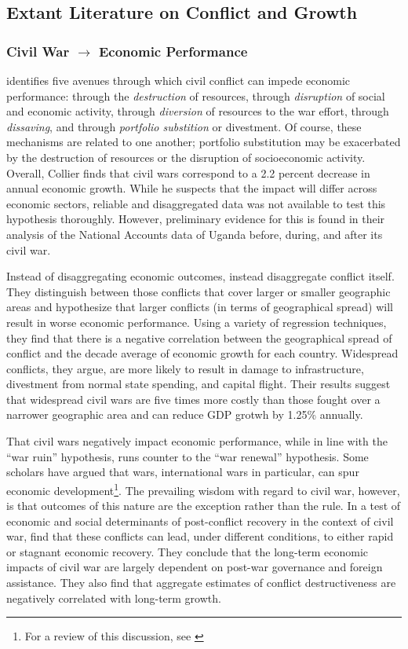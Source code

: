 \subsection{Extant Literature on Conflict and Growth}
\label{lit}

\subsubsection{Civil War $\rightarrow$ Economic Performance}

\cite{collier:1999} identifies five avenues through which civil conflict can impede economic performance: through the \textit{destruction} of resources, through \textit{disruption} of social and economic activity, through \textit{diversion} of resources to the war effort, through \textit{dissaving}, and through \textit{portfolio substition} or divestment. Of course, these mechanisms are related to one another; portfolio substitution may be exacerbated by the destruction of resources or the disruption of socioeconomic activity. Overall, Collier finds that civil wars correspond to a 2.2 percent decrease in annual economic growth. While he suspects that the impact will differ across economic sectors, reliable and disaggregated data was not available to test this hypothesis thoroughly. However, preliminary evidence for this is found in their analysis of the National Accounts data of Uganda before, during, and after its civil war.

Instead of disaggregating economic outcomes, \cite{imai:weinstein:2000} instead disaggregate conflict itself. They distinguish between those conflicts that cover larger or smaller geographic areas and hypothesize that larger conflicts (in terms of geographical spread) will result in worse economic performance. Using a variety of regression techniques, they find that there is a negative correlation between the geographical spread of conflict and the decade average of economic growth for each country. Widespread conflicts, they argue, are more likely to result in damage to infrastructure, divestment from normal state spending, and capital flight. Their results suggest that widespread civil wars are five times more costly than those fought over a narrower geographic area and can reduce GDP grotwh by 1.25\% annually.

That civil wars negatively impact economic performance, while in line with the ``war ruin'' hypothesis, runs counter to the ``war renewal'' hypothesis. Some scholars have argued that wars, international wars in particular, can spur economic development\footnote{For a review of this discussion, see \cite{rasler:thompson:1985}}. The prevailing wisdom with regard to civil war, however, is that outcomes of this nature are the exception rather than the rule. In a test of economic and social determinants of post-conflict recovery in the context of civil war, \cite{kang:meernik:2005} find that these conflicts can lead, under different conditions, to either rapid or stagnant economic recovery. They conclude that the long-term economic impacts of civil war are largely dependent on post-war governance and foreign assistance. They also find that aggregate estimates of conflict destructiveness are negatively correlated with long-term growth.


